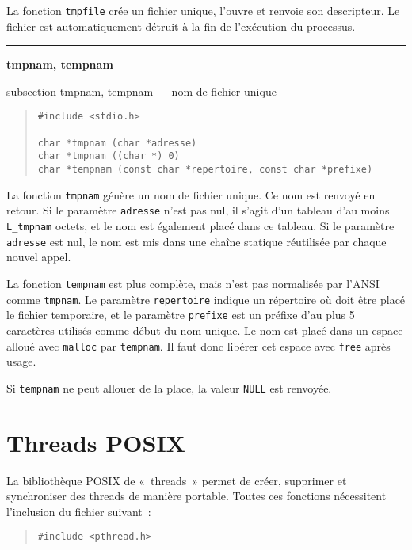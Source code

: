 \documentclass [twoside] {report}
\newcommand {\primitive} [1]
    {
	\phantomsection
	{\large \bf #1}
	\addcontentsline {toc} {subsection} {#1}
    }
\newcommand {\separation}
    {
	\vspace {5mm}
	\nopagebreak
	\hrule
    }
\begin{document}
La fonction {\tt tmpfile} crée un fichier unique, l'ouvre et renvoie son
descripteur. Le fichier est automatiquement détruit à la fin de
l'exécution du processus.


\separation 
\primitive {tmpnam, tempnam} --- nom de fichier unique

\begin {quote}
\begin {verbatim}
#include <stdio.h>

char *tmpnam (char *adresse)
char *tmpnam ((char *) 0)
char *tempnam (const char *repertoire, const char *prefixe)
\end{verbatim}
\end {quote}

La fonction {\tt tmpnam} génère un nom de fichier unique. Ce nom est
renvoyé en retour. Si le paramètre {\tt adresse} n'est pas nul, il s'agit
d'un tableau d'au moins {\tt L\_tmpnam} octets, et le nom
est également placé dans ce tableau. Si le paramètre {\tt adresse} est
nul, le nom est mis dans une chaîne statique réutilisée par chaque
nouvel appel.

La fonction {\tt tempnam} est plus complète, mais n'est pas normalisée
par l'ANSI comme {\tt tmpnam}. Le paramètre {\tt repertoire} indique un
répertoire où doit être placé le fichier temporaire, et le paramètre
{\tt prefixe} est un préfixe d'au plus 5 caractères utilisés comme début
du nom unique. Le nom est placé dans un espace alloué avec {\tt malloc}
par {\tt tempnam}. Il faut donc libérer cet espace avec {\tt free} après
usage.

Si {\tt tempnam} ne peut allouer de la place, la valeur {\tt NULL} est
renvoyée.



\cleardoublepage
\chapter {Threads POSIX}

La bibliothèque POSIX de «~threads~» permet de créer, supprimer et
synchroniser des threads de manière portable. Toutes ces fonctions
nécessitent l'inclusion du fichier suivant~:

\begin {quote}
\begin {verbatim}
#include <pthread.h>
\end{verbatim}
\end {quote}
\end{document}
